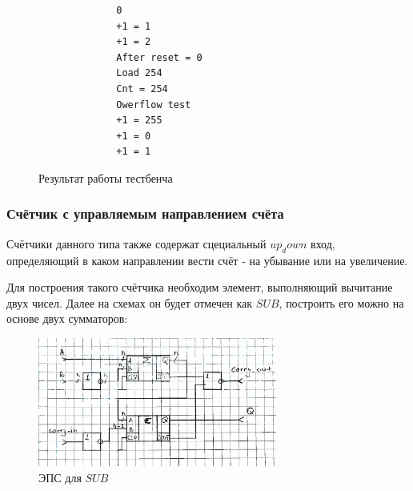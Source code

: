 \documentclass[a4paper]{article}
\begin{document}
  \begin{figure}[H]
    \begin{subfigure}[b]{0.75\textwidth}
      \centering
    \end{subfigure}
    \hfill
    \begin{subfigure}[b]{0.2\textwidth}
      \begin{verbatim}
        0
        +1 = 1
        +1 = 2
        After reset = 0
        Load 254
        Cnt = 254
        Owerflow test
        +1 = 255
        +1 = 0
        +1 = 1
      \end{verbatim}
    \end{subfigure}
    \caption{Результат работы тестбенча}
  \end{figure}

  \subsubsection{Счётчик с управляемым направлением счёта}

  Счётчики данного типа также содержат сцециальный $up_down$ вход,
  определяющий в каком направлении вести счёт - на убывание или на увеличение.

  Для построения такого счётчика необходим элемент, выполняющий вычитание
  двух чисел. Далее на схемах он будет отмечен как $SUB$, построить его можно
  на основе двух сумматоров:

  \begin{figure}[H]
    \centering
    \includegraphics[width=0.7\textwidth]{lab_34.jpg}
    \caption{ЭПС для $SUB$}
  \end{figure}
\end{document}
